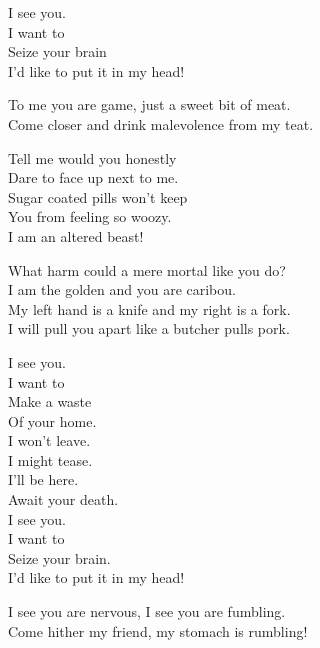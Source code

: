 I see you. \\
I want to \\
Seize your brain \\
I'd like to put it in my head! \\


To me you are game, just a sweet bit of meat. \\
Come closer and drink malevolence from my teat. \\


Tell me would you honestly \\
Dare to face up next to me. \\
Sugar coated pills won't keep \\
You from feeling so woozy. \\

I am an altered beast! \\


What harm could a mere mortal like you do? \\
I am the golden  and you are caribou. \\

My left hand is a knife and my right is a fork. \\
I will pull you apart like a butcher pulls pork. \\


I see you. \\
I want to \\
Make a waste \\
Of your home. \\

I won't leave. \\
I might tease. \\
I'll be here. \\
Await your death. \\

I see you. \\
I want to \\
Seize your brain. \\
I'd like to put it in my head! \\


I see you are nervous, I see you are fumbling. \\
Come hither my friend, my stomach is rumbling! \\

